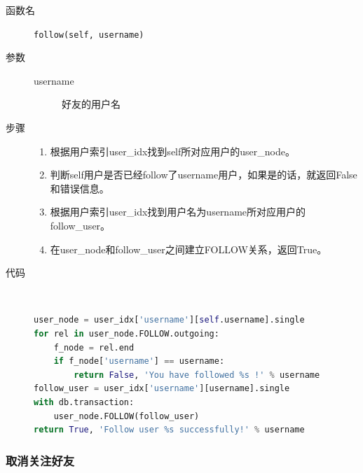 \documentclass{yaldc}
\begin{document}
\begin{description}
    \item[函数名] \verb|follow(self, username)|
    \item[参数]
        \begin{description}
            \item[username] 好友的用户名
        \end{description}
    \item[步骤]
        \begin{enumerate}
            \item 根据用户索引user\_idx找到self所对应用户的user\_node。
            \item 判断self用户是否已经follow了username用户，如果是的话，就返回False和错误信息。
            \item 根据用户索引user\_idx找到用户名为username所对应用户的follow\_user。
            \item 在user\_node和follow\_user之间建立FOLLOW关系，返回True。
        \end{enumerate}
    \item[代码] ~
        \begin{lstlisting}[language=Python]
user_node = user_idx['username'][self.username].single
for rel in user_node.FOLLOW.outgoing:
    f_node = rel.end
    if f_node['username'] == username:
        return False, 'You have followed %s !' % username
follow_user = user_idx['username'][username].single
with db.transaction:
    user_node.FOLLOW(follow_user)
return True, 'Follow user %s successfully!' % username
        \end{lstlisting}
\end{description}

\subsubsection{取消关注好友}
\end{document}
